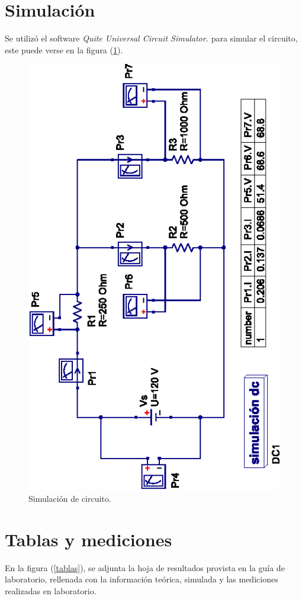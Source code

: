 \documentclass[letter,11pt]{article}
\begin{document}
\section{Simulación}
Se utilizó el software \emph{Quite Universal Circuit Simulator.} para simular
el circuito, este puede verse en la figura (\ref{simulacion}).
\\

\begin{figure}[!h]
\centering
\includegraphics[scale=1.75]{resources/simulacion.eps}
\caption{Simulación de circuito.}
\label{simulacion}
\end{figure}

\newpage

\section{Tablas y mediciones}
En la figura (\ref{tablas}), se adjunta la hoja de resultados provista en la
guía de laboratorio, rellenada con la información teórica, simulada y las
mediciones realizadas en laboratorio.
\end{document}
